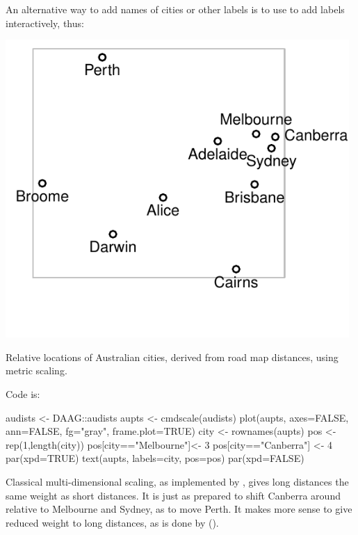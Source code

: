 \noindent
An alternative way to add names of cities or other labels is to use
 to add labels interactively, thus:


\begin{marginfigure}
\begin{Schunk}


\centerline{\includegraphics[width=0.98\textwidth]{figs/9-aupoints-1} }

\end{Schunk}
\caption{Relative locations of Australian cities, derived from road
  map distances, using metric scaling.\label{fig:audists}}
\end{marginfigure}
Code is:
\begin{Schunk}
\begin{Sinput}
audists <- DAAG::audists
aupts <- cmdscale(audists)
plot(aupts, axes=FALSE, ann=FALSE, fg="gray",
     frame.plot=TRUE)
city <- rownames(aupts)
pos <- rep(1,length(city))
pos[city=="Melbourne"]<- 3
pos[city=="Canberra"] <- 4
par(xpd=TRUE)
text(aupts, labels=city, pos=pos)
par(xpd=FALSE)
\end{Sinput}
\end{Schunk}


Classical multi-dimensional scaling, as implemented by
 , gives long distances the same weight as short
 distances.  It is just as prepared to shift Canberra around relative
 to Melbourne and Sydney, as to move Perth.  It makes more sense to
 give reduced weight to long distances, as is done by 
 ().



